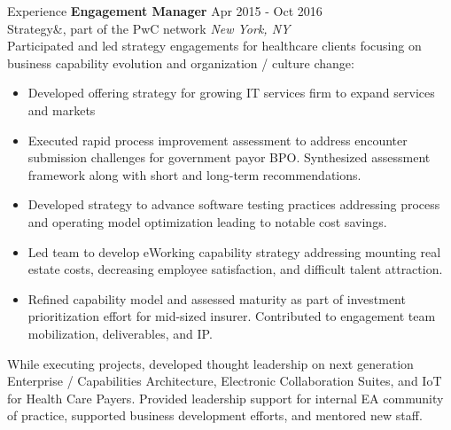 \documentclass{resume} %
\begin{document}
\begin{rSection}{Experience}
\textbf{Engagement Manager} \hfill Apr 2015 - Oct 2016\\
Strategy\&, part of the PwC network \hfill \textit{New York, NY}\\
Participated and led strategy engagements for healthcare clients focusing on business capability evolution and organization / culture change:
\begin{itemize}
   \itemsep -3pt {} 
   \item Developed offering strategy for growing IT services firm to expand services and markets
   \item Executed rapid process improvement assessment to address encounter submission challenges for government payor BPO. Synthesized assessment framework along with short and long-term recommendations.
   \item Developed strategy to advance software testing practices addressing process and operating model optimization leading to notable cost savings.   
   \item Led team to develop eWorking capability strategy addressing mounting real estate costs, decreasing employee satisfaction, and difficult talent attraction.
   \item Refined capability model and assessed maturity as part of investment prioritization effort for mid-sized insurer. Contributed to engagement team mobilization, deliverables, and IP.
\end{itemize}
While executing projects, developed thought leadership on next generation Enterprise / Capabilities Architecture, Electronic Collaboration Suites, and IoT for Health Care Payers. Provided leadership support for internal EA community of practice, supported business development efforts, and mentored new staff.


\end{rSection}
\end{document}
